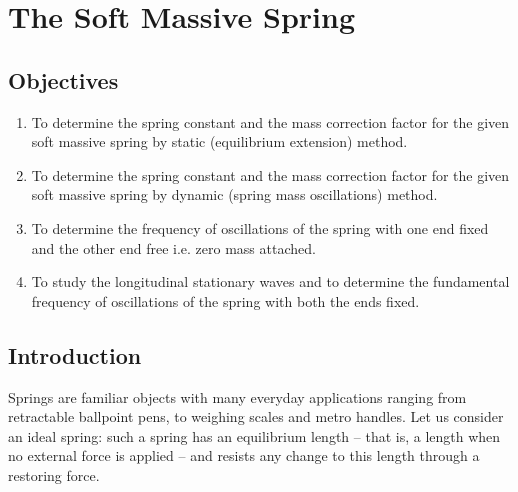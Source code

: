 
\chapter{The Soft Massive Spring}

\section*{Objectives}

\begin{enumerate}
\item To determine the spring constant and the mass correction factor for the given soft massive
spring by static (equilibrium extension) method.
\item To determine the spring constant and the mass correction factor for the given soft massive
spring by dynamic (spring mass oscillations) method.
\item To determine the frequency of oscillations of the spring with one end fixed and the other
end free i.e. zero mass attached.
\item To study the longitudinal stationary waves and to determine the fundamental frequency of
oscillations of the spring with both the ends fixed.
\end{enumerate}

\section*{Introduction}

Springs are familiar objects with many everyday applications ranging from retractable ballpoint pens, to weighing scales and metro handles. Let us consider an ideal spring: such a spring has an equilibrium length -- that is, a length when no external force is applied -- and resists any change to this length through a restoring force.


